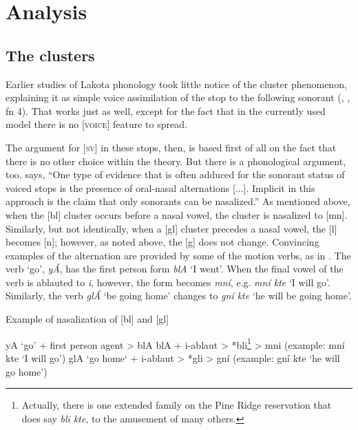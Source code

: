 \documentclass[output=paper]{LSP/langsci}
\begin{document}
\section{Analysis}

\subsection{The clusters}

Earlier studies of Lakota phonology took little notice of the cluster phenomenon, explaining it as simple voice assimilation of the stop to the following sonorant (\citealt[37]{Carter1974}, \citealt[7]{Shaw1980}, \citealt[22]{Patterson1990} fn 4). That works just as well, except for the fact that in the currently used model there is no [\textsc{voice}] feature to spread.

The argument for [\textsc{sv}] in these stops, then, is based first of all on the fact that there is no other choice within the theory. But there is a phonological argument, too. \citet[180]{Botma2011} says, ``One type of evidence that is often adduced for the sonorant status of voiced stops is the presence of oral-nasal alternations [...]. Implicit in this approach is the claim that only sonorants can be nasalized.'' As mentioned above, when the [bl] cluster occurs before a nasal vowel, the cluster is nasalized to [mn]. Similarly, but not identically, when a [gl] cluster precedes a nasal vowel, the [l] becomes [n]; however, as noted above, the [g] does not change. Convincing examples of the alternation are provided by some of the motion verbs, as in . The verb `go', \textit{y\'A}, has the first person form \textit{blA} `I went'. When the final vowel of the verb is ablauted to \textit{i}, however, the form becomes \textit{mn\'i}, e.g. \textit{mn\'i kte} `I will go'. Similarly, the verb \textit{gl\'A} `be going home' changes to \textit{gn\'i kte} `he will be going home'.

\begin{exe}\label{ex:rood:9}
\ex Example of nasalization of [bl] and [gl]
\begin{xlist}
\ex yA `go' + first person agent > blA
\ex blA + i-ablaut > *bli\footnote{Actually, there is one extended family on the Pine Ridge reservation that does say \textit{bli kte}, to the amusement of many others.} > mni (example: mn\'i kte `I will go')
\ex glA `go home` + i-ablaut > *gli > gn\'i (example: gn\'i kte `he will go home')
\end{xlist}
\end{exe}
\end{document}
